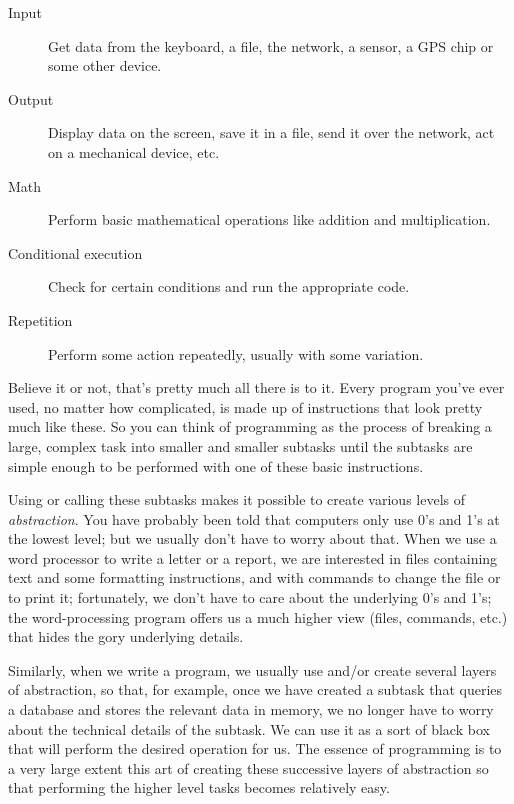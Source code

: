 \begin{description}

\item[Input] Get data from the keyboard, a file, the network, 
a sensor, a GPS chip or some other device.

\item[Output] Display data on the screen, save it in a
file, send it over the network, act on a mechanical device,  etc.

\item[Math] Perform basic mathematical operations like addition and
multiplication.

\item[Conditional execution] Check for certain conditions and
run the appropriate code.

\item[Repetition] Perform some action repeatedly, usually with
some variation.

\end{description}

Believe it or not, that's pretty much all there is to it.  Every
program you've ever used, no matter how complicated, is made up of
instructions that look pretty much like these.  So you can think of
programming as the process of breaking a large, complex task
into smaller and smaller subtasks until the subtasks are
simple enough to be performed with one of these basic instructions.

Using or calling these subtasks makes it possible to create 
various levels of \emph{abstraction}. You have probably 
been told that computers only use 0's and 1's at the 
lowest level; but we usually don't have to worry about that. 
When we use a word processor to write a letter or a report, 
we are interested in files containing text and some 
formatting instructions, and with commands to change the 
file or to print it; fortunately, we don't have to care 
about the underlying 0's and 1's; the word-processing 
program offers us a much higher view (files, 
commands, etc.) that hides the gory underlying details.

Similarly, when we write a program, 
we usually use and/or create several layers of abstraction, 
so that, for example, once we have created a subtask that 
queries a database and stores the relevant data in 
memory, we no longer have to worry about the technical 
details of the subtask. We can use it as a sort of black 
box that will perform the desired operation for us. 
The essence of programming is to a very large extent this 
art of creating these successive layers of abstraction 
so that performing the higher level tasks becomes 
relatively easy.


